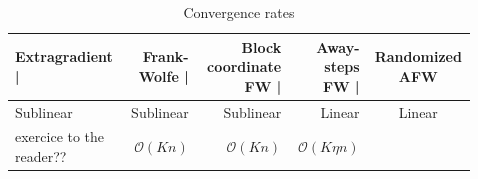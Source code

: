 \documentclass[final]{beamer}
\newlength{\sepwidth}
\newlength{\colwidth}
\newcommand{\separatorcolumn}{\begin{column}{\sepwidth}\end{column}}
\begin{document}
\begin{frame}[t]
\begin{columns}[t]
\begin{column}{\colwidth}
    \begin{table}
      \centering
      \begin{tabular}{l r r r c}
        \toprule
        \textbf{Extragradient |} & \textbf{Frank-Wolfe |} & \textbf{Block coordinate FW |} & \textbf{Away-steps FW |} & \textbf{Randomized AFW}\\
        \midrule
        Sublinear & Sublinear & Sublinear & Linear & Linear\\
        exercice to the reader?? & $\mathcal{O}(Kn)$ & $\mathcal{O}(Kn)$ & $\mathcal{O}(K\eta n)$\\
        \bottomrule
      \end{tabular}
      \caption{Convergence rates}
    \end{table}   
   
   
\end{column}


\separatorcolumn

\begin{column}{\colwidth}


\end{column}
\end{columns}
\end{frame}
\end{document}
